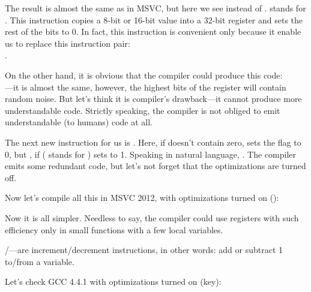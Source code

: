 \label{movzx}

The result is almost the same as in MSVC, but here we see \MOVZX instead of \MOVSX. 
\MOVZX stands for . 
This instruction copies a 8-bit or 16-bit value into a 32-bit register and sets the rest of the bits to 0. 
In fact, this instruction is convenient only because it enable us to replace this instruction pair:\\
.

On the other hand, it is obvious that the compiler could produce this code: \\
---it is almost the same, however, 
the highest bits of the \EAX register will contain random noise. 
But let's think it is compiler's drawback---it cannot produce more understandable code. 
Strictly speaking, the compiler is not obliged to emit understandable (to humans) code at all.


The next new instruction for us is \SETNZ. 
Here, if \AL doesn't contain zero,  
sets the \ZF flag to 0, but \SETNZ, if  ( stands for ) sets \AL to 1.
Speaking in natural language, . 
The compiler emits some redundant code, but let's not forget that the optimizations are turned off.

\label{strlen_MSVC_Ox}

Now let's compile all this in MSVC 2012, with optimizations turned on (\Ox):



Now it is all simpler.
Needless to say, the compiler could use registers with such efficiency
only in small functions with a few local variables.

\INC/\DEC---are \gls{increment}/\gls{decrement} instructions, in other words: add or subtract 1 to/from a variable.




Let's check GCC 4.4.1 with optimizations turned on (\Othree key):


 
